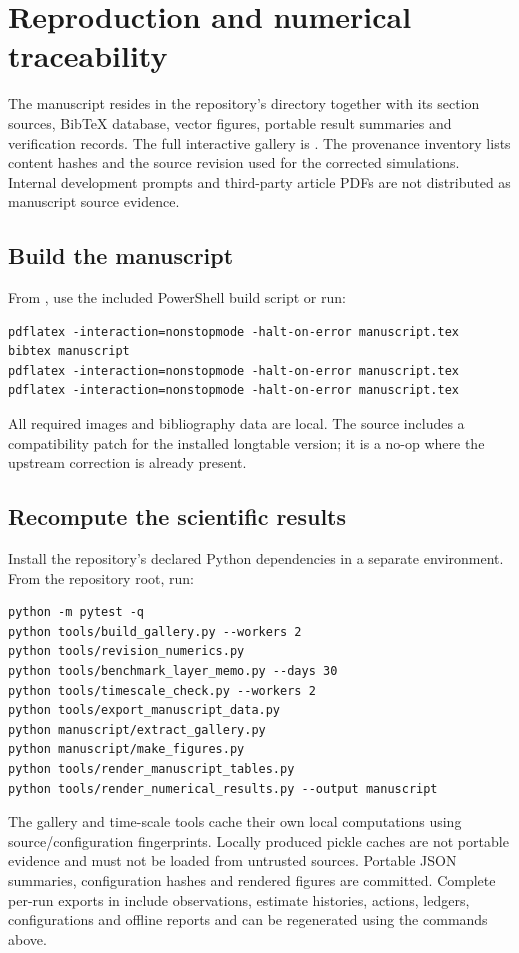 \section{Reproduction and numerical traceability}
\label{app:reproduction}
The manuscript resides in the repository's  directory together with its section sources, BibTeX database, vector figures, portable result summaries and verification records. The full interactive gallery is . The provenance inventory lists content hashes and the source revision used for the corrected simulations. Internal development prompts and third-party article PDFs are not distributed as manuscript source evidence.

\subsection{Build the manuscript}
From , use the included PowerShell build script or run:
\begin{verbatim}
pdflatex -interaction=nonstopmode -halt-on-error manuscript.tex
bibtex manuscript
pdflatex -interaction=nonstopmode -halt-on-error manuscript.tex
pdflatex -interaction=nonstopmode -halt-on-error manuscript.tex
\end{verbatim}
All required images and bibliography data are local. The source includes a compatibility patch for the installed longtable version; it is a no-op where the upstream correction is already present.

\subsection{Recompute the scientific results}
Install the repository's declared Python dependencies in a separate environment. From the repository root, run:
\begin{verbatim}
python -m pytest -q
python tools/build_gallery.py --workers 2
python tools/revision_numerics.py
python tools/benchmark_layer_memo.py --days 30
python tools/timescale_check.py --workers 2
python tools/export_manuscript_data.py
python manuscript/extract_gallery.py
python manuscript/make_figures.py
python tools/render_manuscript_tables.py
python tools/render_numerical_results.py --output manuscript
\end{verbatim}
The gallery and time-scale tools cache their own local computations using source/configuration fingerprints. Locally produced pickle caches are not portable evidence and must not be loaded from untrusted sources. Portable JSON summaries, configuration hashes and rendered figures are committed. Complete per-run exports in  include observations, estimate histories, actions, ledgers, configurations and offline reports and can be regenerated using the commands above.

